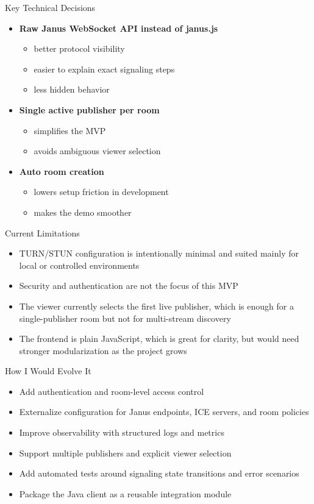 \documentclass[aspectratio=169]{beamer}
\begin{document}
\begin{frame}{Key Technical Decisions}
  \begin{itemize}
    \item \textbf{Raw Janus WebSocket API instead of janus.js}
    \begin{itemize}
      \item better protocol visibility
      \item easier to explain exact signaling steps
      \item less hidden behavior
    \end{itemize}
    \item \textbf{Single active publisher per room}
    \begin{itemize}
      \item simplifies the MVP
      \item avoids ambiguous viewer selection
    \end{itemize}
    \item \textbf{Auto room creation}
    \begin{itemize}
      \item lowers setup friction in development
      \item makes the demo smoother
    \end{itemize}
  \end{itemize}
\end{frame}

\begin{frame}{Current Limitations}
  \begin{itemize}
    \item TURN/STUN configuration is intentionally minimal and suited mainly for local or controlled environments
    \item Security and authentication are not the focus of this MVP
    \item The viewer currently selects the first live publisher, which is enough for a single-publisher room but not for multi-stream discovery
    \item The frontend is plain JavaScript, which is great for clarity, but would need stronger modularization as the project grows
  \end{itemize}
\end{frame}

\begin{frame}{How I Would Evolve It}
  \begin{itemize}
    \item Add authentication and room-level access control
    \item Externalize configuration for Janus endpoints, ICE servers, and room policies
    \item Improve observability with structured logs and metrics
    \item Support multiple publishers and explicit viewer selection
    \item Add automated tests around signaling state transitions and error scenarios
    \item Package the Java client as a reusable integration module
  \end{itemize}
\end{frame}
\end{document}
